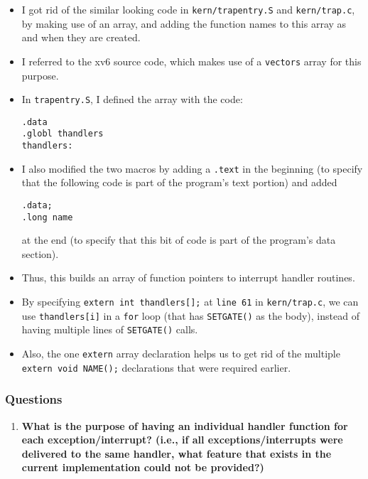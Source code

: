 \documentclass[]{article}
\begin{document}
\begin{itemize}
\item
  I got rid of the similar looking code in \texttt{kern/trapentry.S} and
  \texttt{kern/trap.c}, by making use of an array, and adding the
  function names to this array as and when they are created.
\item
  I referred to the xv6 source code, which makes use of a
  \texttt{vectors} array for this purpose.
\item
  In \texttt{trapentry.S}, I defined the array with the code:

\begin{verbatim}
.data
.globl thandlers
thandlers:
\end{verbatim}
\item
  I also modified the two macros by adding a \texttt{.text} in the
  beginning (to specify that the following code is part of the program's
  text portion) and added

\begin{verbatim}
.data;
.long name
\end{verbatim}

  at the end (to specify that this bit of code is part of the program's
  data section).
\item
  Thus, this builds an array of function pointers to interrupt handler
  routines.
\item
  By specifying \texttt{extern int thandlers{[}{]};} at \texttt{line 61}
  in \texttt{kern/trap.c}, we can use \texttt{thandlers{[}i{]}} in a
  \texttt{for} loop (that has \texttt{SETGATE()} as the body), instead
  of having multiple lines of \texttt{SETGATE()} calls.
\item
  Also, the one \texttt{extern} array declaration helps us to get rid of
  the multiple \texttt{extern void NAME();} declarations that were
  required earlier.
\end{itemize}

\subsubsection{Questions}

\begin{enumerate}
\def\labelenumi{\arabic{enumi}.}
\itemsep1pt\parskip0pt
\item
  \textbf{What is the purpose of having an individual handler function
  for each exception/interrupt? (i.e., if all exceptions/interrupts were
  delivered to the same handler, what feature that exists in the current
  implementation could not be provided?)}
\end{enumerate}
\end{document}
